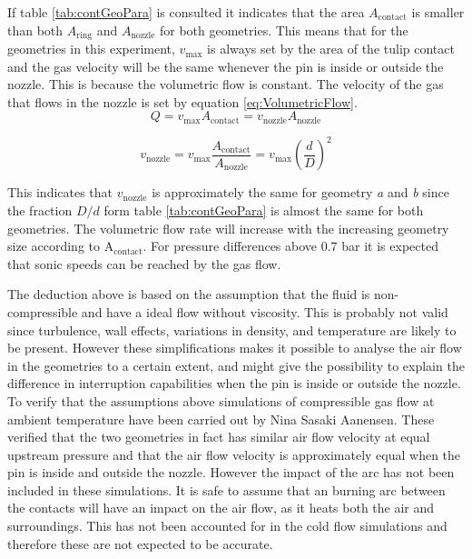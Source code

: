 \documentclass[10pt,a4paper,twoside]{article}
\begin{document}
If table \ref{tab:contGeoPara} is consulted it indicates that the area $ A_\mathrm{{contact}}$ is smaller than both $A_\mathrm{{ring}}$ and $A_\mathrm{{nozzle}}$ for both geometries. This means that for the geometries in this experiment, $v_\mathrm{{max}}$ is always set by the area of the tulip contact and the gas velocity will be the same whenever the pin is inside or outside the nozzle. This is because the volumetric flow is constant. The velocity of the gas that flows in the nozzle is set by equation \eqref{eq:VolumetricFlow}.
\begin{equation*}
Q=v_\mathrm{{max}} A_\mathrm{{contact}} = v_\mathrm{{nozzle}} A_\mathrm{{nozzle}}
\end{equation*}


\begin{equation} \label{eq:VolumetricFlow}
v_\mathrm{{nozzle}}= v_\mathrm{{max}}\frac{A_\mathrm{{contact}}}{A_\mathrm{{nozzle}} }= v_\mathrm{{max}} \left(\frac{d}{D}\right)^2
\end{equation} 

This indicates that $v_\mathrm{{nozzle}}$ is approximately the same for geometry \textit{a} and \textit{b} since the fraction $D/d$ form table \ref{tab:contGeoPara} is almost the same for both geometries. The volumetric flow rate will increase with the increasing geometry size according to A$_\mathrm{{contact}}$. For pressure differences above 0.7 bar it is expected that sonic speeds can be reached by the gas flow.

The deduction above is based on the assumption that the fluid is non-compressible and have a ideal flow without viscosity. This is probably not valid since turbulence, wall effects, variations in density, and temperature are likely to be present. However these simplifications makes it possible to analyse the air flow in the geometries to a certain extent, and might give the possibility to explain the difference in interruption capabilities when the pin is inside or outside the nozzle. To verify that the assumptions above simulations of compressible gas flow at ambient temperature have been carried out by Nina Sasaki Aanensen. These verified that the two geometries in fact has similar air flow velocity at equal upstream pressure and that the air flow velocity is approximately equal when the pin is inside and outside the nozzle. However the impact of the arc has not been included in these simulations. It is safe to assume that an burning arc between the contacts will have an impact on the air flow, as it heats both the air and surroundings. This has not been accounted for in the cold flow simulations and therefore these are not expected to be accurate.
\end{document}

